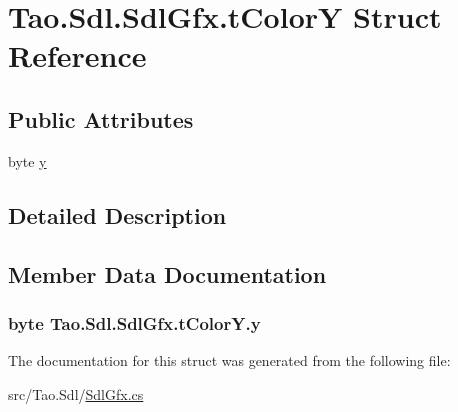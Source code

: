 \hypertarget{struct_tao_1_1_sdl_1_1_sdl_gfx_1_1t_color_y}{
\section{Tao.Sdl.SdlGfx.tColorY Struct Reference}
\label{struct_tao_1_1_sdl_1_1_sdl_gfx_1_1t_color_y}
}
\subsection*{Public Attributes}
\begin{DoxyCompactItemize}
\item 
byte \hyperlink{struct_tao_1_1_sdl_1_1_sdl_gfx_1_1t_color_y_a069da6dfb7c2ba51f58a1f25690a4297}{y}
\end{DoxyCompactItemize}


\subsection{Detailed Description}


\subsection{Member Data Documentation}
\hypertarget{struct_tao_1_1_sdl_1_1_sdl_gfx_1_1t_color_y_a069da6dfb7c2ba51f58a1f25690a4297}{
\subsubsection[{y}]{\setlength{\rightskip}{0pt plus 5cm}byte {\bf Tao.Sdl.SdlGfx.tColorY.y}}}
\label{struct_tao_1_1_sdl_1_1_sdl_gfx_1_1t_color_y_a069da6dfb7c2ba51f58a1f25690a4297}


The documentation for this struct was generated from the following file:\begin{DoxyCompactItemize}
\item 
src/Tao.Sdl/\hyperlink{_sdl_gfx_8cs}{SdlGfx.cs}\end{DoxyCompactItemize}
